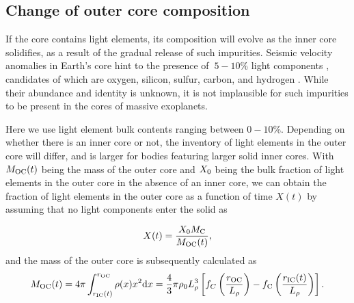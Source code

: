 \documentclass[draft]{agujournal2019} %
\begin{document}
\subsection{Change of outer core composition}

If the core contains light elements, its composition will evolve as the inner core solidifies, as a result of the gradual release of such impurities. Seismic velocity anomalies in Earth's core hint to the presence of $~5-10\%$ light components \cite{hirose2013composition,badro_core_2015}, candidates of which are oxygen, silicon, sulfur, carbon, and hydrogen \cite{poirier1994light}. While their abundance and identity is unknown, it is not implausible for such impurities to be present in the cores of massive exoplanets.

Here we use light element bulk contents ranging between $0-10$\%. Depending on whether there is an inner core or not, the inventory of light elements in the outer core will differ, and is larger for bodies featuring larger solid inner cores. With $M_{\rm OC}(t)$ being the mass of the outer core and $X_{\rm 0}$ being the bulk fraction of light elements in the outer core in the absence of an inner core, we can obtain the fraction of light elements in the outer core as a function of time $X(t)$ by assuming that no light components enter the solid as
\begin{linenomath*}
\begin{equation}
X(t) = \frac{X_{\rm 0} M_{\rm C}}{M_{\rm OC}(t)}, 
\end{equation}
and the mass of the outer core is subsequently calculated as 
\begin{equation}
 M_{\rm OC}(t) = 4 \pi   \int^{r_{\rm OC}}_{r_{\rm IC}(t)} \rho(x) x^2 {\rm d}x = \frac{4}{3}\pi \rho_0 L_\rho^3\left [ f_C\left ( \frac{r_{\rm OC}}{L_\rho}\right  ) -  f_{\rm C}\left (\frac{r_{\rm IC}(t)}{L_\rho}\right  )\right ].
\end{equation}
\end{linenomath*}
\end{document}
